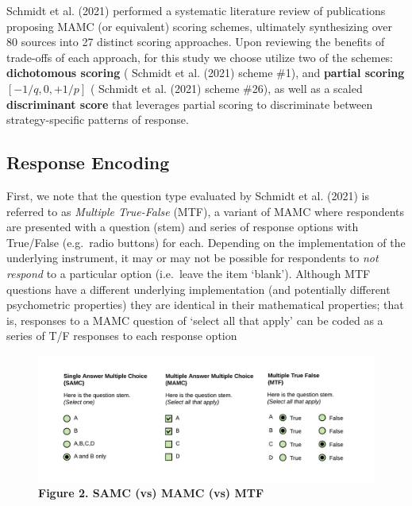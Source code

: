 \documentclass[
  letterpaper,
  DIV=11,
  numbers=noendperiod]{scrreprt}
\begin{document}
Schmidt et al. (2021) performed a systematic literature review of
publications proposing MAMC (or equivalent) scoring schemes, ultimately
synthesizing over 80 sources into 27 distinct scoring approaches. Upon
reviewing the benefits of trade-offs of each approach, for this study we
choose utilize two of the schemes: \textbf{dichotomous scoring} (
Schmidt et al. (2021) scheme \#1), and \textbf{partial scoring}
\([-1/q,0, +1/p]\) ( Schmidt et al. (2021) scheme \#26), as well as a
scaled \textbf{discriminant score} that leverages partial scoring to
discriminate between strategy-specific patterns of response.

\hypertarget{response-encoding}{%
\subsection{Response Encoding}\label{response-encoding}}

First, we note that the question type evaluated by Schmidt et al. (2021)
is referred to as \emph{Multiple True-False} (MTF), a variant of MAMC
where respondents are presented with a question (stem) and series of
response options with True/False (e.g.~radio buttons) for each.
Depending on the implementation of the underlying instrument, it may or
may not be possible for respondents to \emph{not respond} to a
particular option (i.e.~leave the item `blank'). Although MTF questions
have a different underlying implementation (and potentially different
psychometric properties) they are identical in their mathematical
properties; that is, responses to a MAMC question of `select all that
apply' can be coded as a series of T/F responses to each response option

\begin{figure}

{\centering \includegraphics{analysis/SGC3A/static/img/MAMC-MTF.png}

}

\caption{\label{fig-ItemTypes}\textbf{Figure 2. SAMC (vs) MAMC (vs)
MTF}}

\end{figure}
\end{document}
